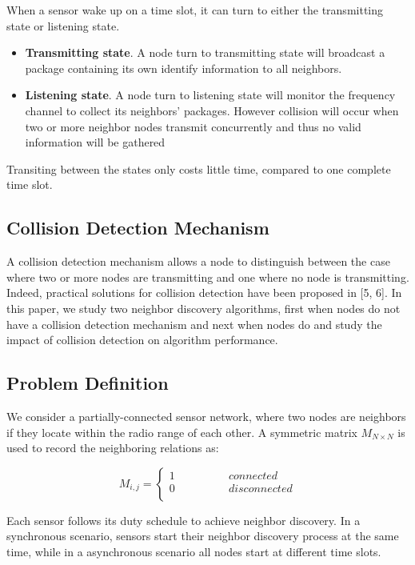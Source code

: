When a sensor wake up on a time slot, it can turn to either the transmitting state or listening state. 
\begin{itemize}
\item \textbf{Transmitting state}. A node turn to transmitting state will broadcast a package containing its own identify 
information to all neighbors.
\item  \textbf{Listening state}. A node turn to listening state will monitor the frequency channel to collect its neighbors' packages.
However collision will occur when two or more neighbor nodes transmit concurrently and thus no valid information will be gathered
\end{itemize}
Transiting between the states only costs little time, compared to one complete time slot.

\subsection{Collision Detection Mechanism}

A collision detection mechanism allows a node to distinguish between 
the case where two or more nodes are transmitting and one where no 
node is transmitting. Indeed, practical solutions for collision detection 
have been proposed in [5, 6]. In this paper, we study two neighbor 
discovery algorithms, first when nodes do not have a collision detection 
mechanism and next when nodes do and study the impact of collision 
detection on algorithm performance.





\subsection{Problem Definition}

We consider a partially-connected sensor network, 
where two nodes are neighbors if they locate within the radio range of each other. 
A  symmetric matrix $M_{N\times N}$ is used to record the neighboring relations as:

$$ M_{i,j}=\left\{
\begin{aligned}
1  & & & & & & {connected}\\
0  & & & & & & {disconnected}\\
\end{aligned}
\right.
$$

Each sensor follows its duty schedule to achieve neighbor discovery. In a synchronous scenario,
sensors start their neighbor discovery process at the same time, while in a asynchronous  scenario
all nodes start at different time slots.
 

